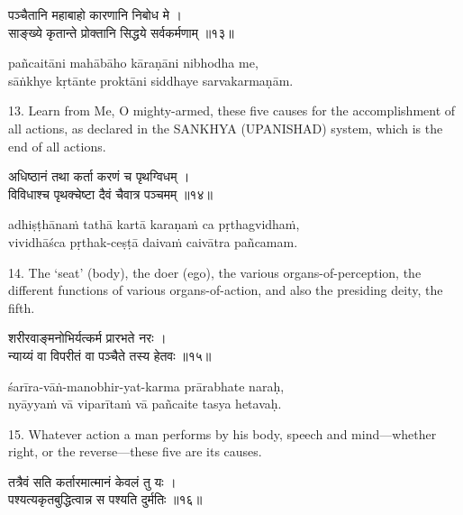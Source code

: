 \begin{gitaverse}
पञ्चैतानि महाबाहो कारणानि निबोध मे । \\
साङ्ख्ये कृतान्ते प्रोक्तानि सिद्धये सर्वकर्मणाम् ॥१३॥
\end{gitaverse}

\begin{transliteration}
pañcaitāni mahābāho kāraṇāni nibhodha me, \\
sāṅkhye kṛtānte proktāni siddhaye sarvakarmaṇām.
\end{transliteration}

13. Learn from Me, O mighty-armed, these five causes for the accomplishment of
all actions, as declared in the SANKHYA (UPANISHAD) system, which is the end of
all actions.

\begin{gitaverse}
अधिष्ठानं तथा कर्ता करणं च पृथग्विधम् । \\
विविधाश्च पृथक्चेष्टा दैवं चैवात्र पञ्चमम् ॥१४॥
\end{gitaverse}

\begin{transliteration}
adhiṣṭhānaṁ tathā kartā karaṇaṁ ca pṛthagvidhaṁ, \\
vividhāśca pṛthak-ceṣṭā daivaṁ caivātra pañcamam.
\end{transliteration}

14. The `seat' (body), the doer (ego), the various organs-of-perception, the
different functions of various organs-of-action, and also the presiding deity,
the fifth.

\begin{gitaverse}
शरीरवाङ्मनोभिर्यत्कर्म प्रारभते नरः । \\
न्याय्यं वा विपरीतं वा पञ्चैते तस्य हेतवः ॥१५॥
\end{gitaverse}

\begin{transliteration}
śarīra-vāṅ-manobhir-yat-karma prārabhate naraḥ, \\
nyāyyaṁ vā viparītaṁ vā pañcaite tasya hetavaḥ.
\end{transliteration}

15. Whatever action a man performs by his body, speech and mind---whether
right, or the reverse---these five are its causes.

\begin{gitaverse}
तत्रैवं सति कर्तारमात्मानं केवलं तु यः । \\
पश्यत्यकृतबुद्धित्वान्न स पश्यति दुर्मतिः ॥१६॥
\end{gitaverse}

